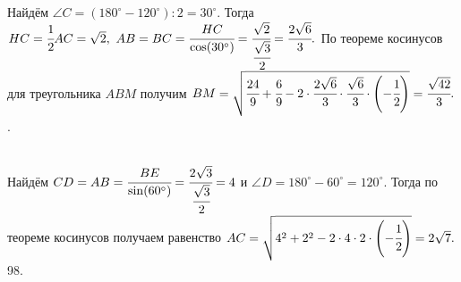 \documentclass[12pt]{article}
\begin{document}
Найдём $\angle C=(180^\circ-120^\circ):2=30^\circ.$ Тогда  $HC=\cfrac{1}{2}AC=\sqrt{2},\ AB=BC=\cfrac{HC}{\cos(30^\circ)}=\cfrac{\sqrt{2}}{\cfrac{\sqrt{3}}{2}}=\cfrac{2\sqrt{6}}{3}.$ По теореме косинусов для треугольника $ABM$ получим $BM=\sqrt{\cfrac{24}{9}+\cfrac{6}{9}-2\cdot\cfrac{2\sqrt{6}}{3}\cdot\cfrac{\sqrt{6}}{3}\cdot\left(-\cfrac{1}{2}\right)}=\cfrac{\sqrt{42}}{3}.$\newpage{}. \begin{figure}[ht!]
\end{figure}\\
Найдём $CD=AB=\cfrac{BE}{\sin(60^\circ)}=\cfrac{2\sqrt{3}}{\cfrac{\sqrt{3}}{2}}=4$ и $\angle D=180^\circ-60^\circ=120^\circ.$ Тогда по теореме косинусов получаем равенство $AC=\sqrt{4^2+2^2-2\cdot4\cdot2\cdot\left(-\cfrac{1}{2}\right)}=2\sqrt{7}.$\\
98. \begin{figure}[ht!]
\end{figure}\\
\end{document}
